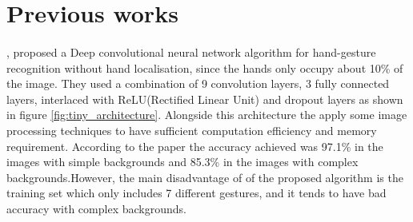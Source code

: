 \documentclass[12pt]{report}
\begin{document}
        \section{Previous works}
            \paragraph{}
                \cite{Bao2017}, proposed a Deep convolutional neural network algorithm for hand-gesture 
                recognition without hand localisation, since the hands only occupy about 10\% of 
                the image. They used a combination of 9 convolution layers, 3 fully connected layers, 
                interlaced with ReLU(Rectified Linear Unit) and dropout layers as shown in 
                figure \ref{fig:tiny_architecture}. Alongside this architecture the apply some image 
                processing techniques to have sufficient computation efficiency and memory requirement.
                According to the paper the accuracy achieved was 97.1\% in the images with simple backgrounds
                and 85.3\% in the images with complex backgrounds.However, the main disadvantage of of 
                the proposed algorithm is the training set which only includes 7 different gestures,
                and it tends to have bad accuracy with complex backgrounds.
             
\end{document}
